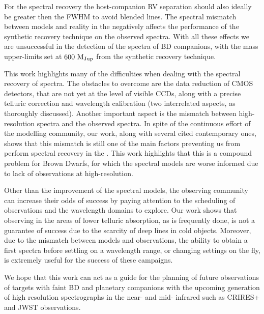 For the spectral recovery the host-companion {RV} separation should also ideally be greater then the {FWHM} to avoid blended lines.
The spectral mismatch between models and reality in the \nir{} negatively affects the performance of the synthetic recovery technique on the observed spectra.
With all these effects we are unsuccessful in the detection of the \nir{} spectra of {BD} companions,  with the mass upper-limits set at \(\rm 600~M_{Jup}\) from the synthetic recovery technique.

This work highlights many of the difficulties when dealing with the spectral recovery of \nir{} spectra.
The obstacles to overcome are the data reduction of \nir{} CMOS detectors, that are not yet at the level of visible CCDs, along with a precise telluric correction and wavelength calibration (two interrelated aspects, as thoroughly discussed).
Another important aspect is the mismatch between \nir{} high-resolution spectra and the observed spectra.
In spite of the continuous effort of the modelling community, our work, along with several cited contemporary ones, shows that this mismatch is still one of the main factors preventing us from perform spectral recovery in the \nir{}.
This work highlights that this is a compound problem for Brown Dwarfs, for which the spectral models are worse informed due to lack of observations at high-resolution.

Other than the improvement of the spectral models, the observing community can increase their odds of success by paying attention to the scheduling of observations and the wavelength domains to explore.
Our work shows that observing in the areas of lower telluric absorption, as is frequently done, is not a guarantee of success due to the scarcity of deep lines in cold objects.
Moreover, due to the mismatch between models and observations, the ability to obtain a first spectra before settling on a wavelength range, or changing settings on the fly, is extremely useful for the success of these campaigns.

We hope that this work can act as a guide for the planning of future observations of targets with faint {BD} and planetary companions with the upcoming generation of high resolution spectrographs in the near- and mid- infrared such as CRIRES+ and {JWST} observations.














